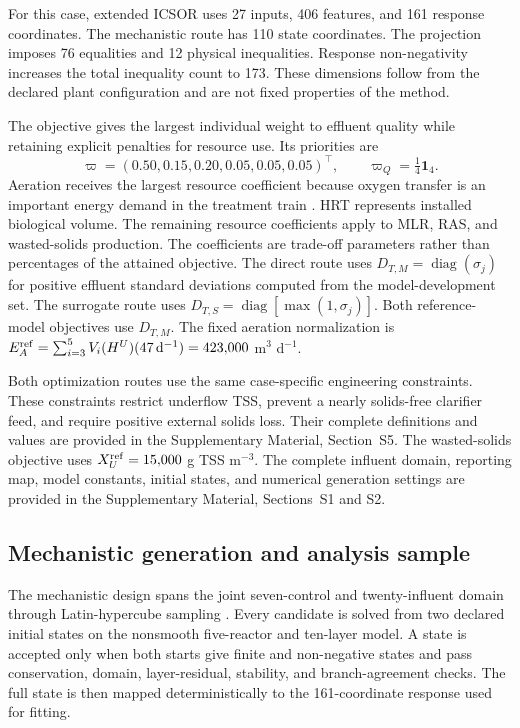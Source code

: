 \documentclass[a4paper,fleqn]{cas-sc}
\begin{document}
For this case, extended ICSOR uses 27 inputs, 406 features, and 161 response coordinates. The mechanistic route has 110 state coordinates. The projection imposes 76 equalities and 12 physical inequalities. Response non-negativity increases the total inequality count to 173. These dimensions follow from the declared plant configuration and are not fixed properties of the method.

The objective gives the largest individual weight to effluent quality while retaining explicit penalties for resource use. Its priorities are
\begin{equation}
\varpi=(0.50,0.15,0.20,0.05,0.05,0.05)^\top,
\qquad \varpi_Q=\tfrac14\mathbf1_4.
\label{eq:caseweights}
\end{equation}
Aeration receives the largest resource coefficient because oxygen transfer is an important energy demand in the treatment train \citep{Leu2012}. HRT represents installed biological volume. The remaining resource coefficients apply to MLR, RAS, and wasted-solids production. The coefficients are trade-off parameters rather than percentages of the attained objective. The direct route uses $D_{T,M}=\operatorname{diag}(\sigma_j)$ for positive effluent standard deviations computed from the model-development set. The surrogate route uses $D_{T,S}=\operatorname{diag}[\max(1,\sigma_j)]$. Both reference-model objectives use $D_{T,M}$. The fixed aeration normalization is $E_A^{\rm ref}=\sum_{i=3}^{5}V_i(H^U)(47\,\mathrm{d}^{-1})=423{,}000$ m$^3$ d$^{-1}$.

Both optimization routes use the same case-specific engineering constraints. These constraints restrict underflow TSS, prevent a nearly solids-free clarifier feed, and require positive external solids loss. Their complete definitions and values are provided in the Supplementary Material, Section~S5. The wasted-solids objective uses $X_U^{\rm ref}=15{,}000$ g TSS m$^{-3}$. The complete influent domain, reporting map, model constants, initial states, and numerical generation settings are provided in the Supplementary Material, Sections~S1 and S2.

\subsection{Mechanistic generation and analysis sample}

The mechanistic design spans the joint seven-control and twenty-influent domain through Latin-hypercube sampling \citep{McKay1979}. Every candidate is solved from two declared initial states on the nonsmooth five-reactor and ten-layer model. A state is accepted only when both starts give finite and non-negative states and pass conservation, domain, layer-residual, stability, and branch-agreement checks. The full state is then mapped deterministically to the 161-coordinate response used for fitting.
\end{document}
